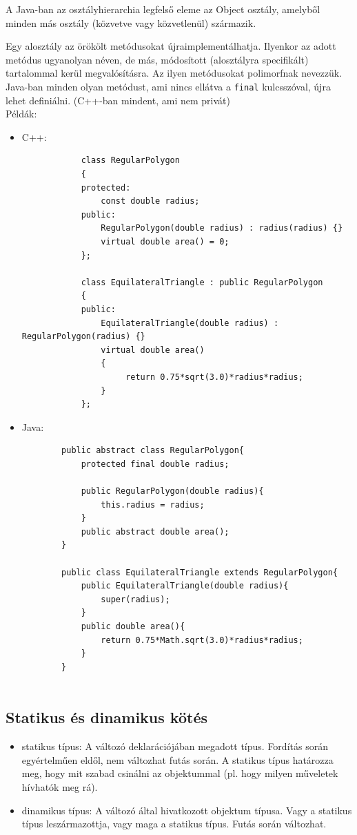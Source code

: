 \documentclass[margin=0px]{article}
\begin{document}
	A Java-ban az osztályhierarchia legfelső eleme az Object osztály, amelyből minden más osztály (közvetve vagy közvetlenül) származik.
	
	Egy alosztály az örökölt metódusokat újraimplementálhatja. Ilyenkor az adott metódus ugyanolyan néven, de más, módosított (alosztályra specifikált) tartalommal kerül megvalósításra. Az ilyen metódusokat polimorfnak nevezzük. Java-ban minden olyan metódust, ami nincs ellátva a \texttt{final} kulcsszóval, újra lehet definiálni. (C++-ban mindent, ami nem privát)\\
	
	\noindent Példák:
	\begin{itemize}
		\item	C++:
		\begin{verbatim}
		    class RegularPolygon
		    {
		    protected:
		        const double radius;
		    public:
		        RegularPolygon(double radius) : radius(radius) {}
		        virtual double area() = 0;
		    };
		    
		    class EquilateralTriangle : public RegularPolygon
		    {
		    public:
		        EquilateralTriangle(double radius) : RegularPolygon(radius) {}
		        virtual double area()
		        {
		             return 0.75*sqrt(3.0)*radius*radius;
		        }
		    };
		\end{verbatim}
		
		\item	Java:
		\begin{verbatim}
		public abstract class RegularPolygon{
		    protected final double radius;
		
		    public RegularPolygon(double radius){
		        this.radius = radius;
		    }
		    public abstract double area();
		}
		
		public class EquilateralTriangle extends RegularPolygon{
		    public EquilateralTriangle(double radius){
		        super(radius);
		    }
		    public double area(){
	 	        return 0.75*Math.sqrt(3.0)*radius*radius;
		    }
		}
		
		\end{verbatim}
	\end{itemize}
	
	\subsection{Statikus és dinamikus kötés}
	
	\begin{itemize}
		\item	statikus típus: A változó deklarációjában megadott típus. Fordítás során egyértelműen eldől, nem változhat
		futás során. A statikus típus határozza meg, hogy mit szabad csinálni az objektummal (pl. hogy milyen
		műveletek hívhatók meg rá).
		
		\item	dinamikus típus: A változó által hivatkozott objektum típusa. Vagy a statikus típus leszármazottja, vagy maga
		a statikus típus. Futás során változhat.
	\end{itemize}
	
\end{document}
